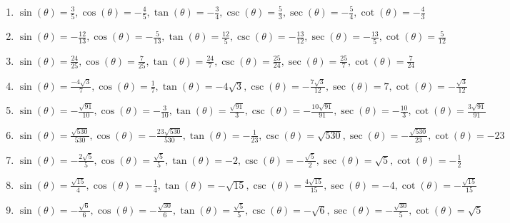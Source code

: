 \documentclass{ximera}
\begin{document}
\begin{enumerate}

\setcounter{enumi}{\value{HW}}

\item $\sin(\theta) = \frac{3}{5}, \cos(\theta) = -\frac{4}{5}, \tan(\theta) = -\frac{3}{4}, \csc(\theta) = \frac{5}{3}, \sec(\theta) = -\frac{5}{4}, \cot(\theta) = -\frac{4}{3}$

\item $\sin(\theta) = -\frac{12}{13}, \cos(\theta) = -\frac{5}{13}, \tan(\theta) = \frac{12}{5}, \csc(\theta) = -\frac{13}{12}, \sec(\theta) = -\frac{13}{5}, \cot(\theta) = \frac{5}{12}$

\item $\sin(\theta) = \frac{24}{25}, \cos(\theta) = \frac{7}{25}, \tan(\theta) = \frac{24}{7}, \csc(\theta) = \frac{25}{24}, \sec(\theta) = \frac{25}{7}, \cot(\theta) = \frac{7}{24}$

\item $\sin(\theta) = \frac{-4\sqrt{3}}{7}, \cos(\theta) = \frac{1}{7}, \tan(\theta) = -4\sqrt{3}, \csc(\theta) = -\frac{7\sqrt{3}}{12}, \sec(\theta) = 7, \cot(\theta) = -\frac{\sqrt{3}}{12}$

\item $\sin(\theta) = -\frac{\sqrt{91}}{10}, \cos(\theta) = -\frac{3}{10}, \tan(\theta) = \frac{\sqrt{91}}{3}, \csc(\theta) = -\frac{10\sqrt{91}}{91}, \sec(\theta) = -\frac{10}{3}, \cot(\theta) = \frac{3\sqrt{91}}{91}$

\item $\sin(\theta) = \frac{\sqrt{530}}{530}, \cos(\theta) = -\frac{23\sqrt{530}}{530}, \tan(\theta) = -\frac{1}{23}, \csc(\theta) = \sqrt{530}, \sec(\theta) = -\frac{\sqrt{530}}{23}, \cot(\theta) = -23$

\item $\sin(\theta) = -\frac{2\sqrt{5}}{5}, \cos(\theta) = \frac{\sqrt{5}}{5}, \tan(\theta) = -2, \csc(\theta) = -\frac{\sqrt{5}}{2}, \sec(\theta) = \sqrt{5}, \cot(\theta) = -\frac{1}{2}$

\item  $\sin(\theta) = \frac{\sqrt{15}}{4}, \cos(\theta) = -\frac{1}{4}, \tan(\theta) = -\sqrt{15}, \csc(\theta) = \frac{4\sqrt{15}}{15}, \sec(\theta) = -4, \cot(\theta) = -\frac{\sqrt{15}}{15}$

\item $\sin(\theta) = -\frac{\sqrt{6}}{6}, \cos(\theta) = -\frac{\sqrt{30}}{6}, \tan(\theta) = \frac{\sqrt{5}}{5}, \csc(\theta) = -\sqrt{6}, \sec(\theta) = -\frac{\sqrt{30}}{5}, \cot(\theta) = \sqrt{5}$


\end{enumerate}
\end{document}

